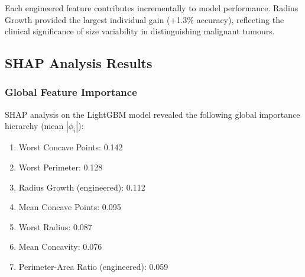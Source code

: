 \documentclass[journal]{IEEEtran}
\begin{document}
\begin{table}[htbp]
\centering
\caption{Ablation Study: Impact of Domain Feature Engineering}
\label{tab:ablation}
\end{table}

Each engineered feature contributes incrementally to model performance. Radius Growth provided the largest individual gain (+1.3\% accuracy), reflecting the clinical significance of size variability in distinguishing malignant tumours.

\subsection{SHAP Analysis Results}

\subsubsection{Global Feature Importance}

SHAP analysis on the LightGBM model revealed the following global importance hierarchy (mean $|\phi_i|$):

\begin{enumerate}
\item Worst Concave Points: 0.142
\item Worst Perimeter: 0.128
\item Radius Growth (engineered): 0.112
\item Mean Concave Points: 0.095
\item Worst Radius: 0.087
\item Mean Concavity: 0.076
\item Perimeter-Area Ratio (engineered): 0.059
\end{enumerate}
\end{document}
